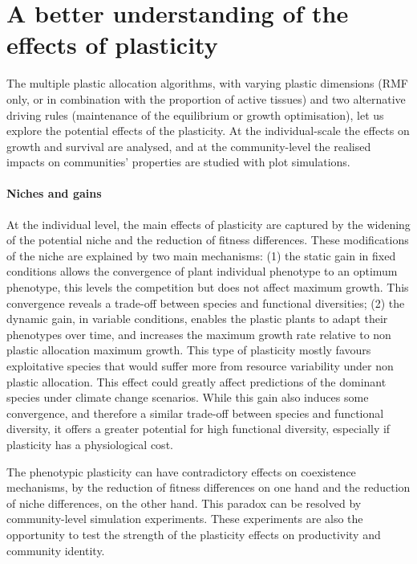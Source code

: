 \section{A better understanding of the effects of plasticity}

The multiple plastic allocation algorithms, with varying plastic dimensions (RMF only, or in combination with the proportion of active tissues) and two alternative driving rules (maintenance of the equilibrium or growth optimisation), let us explore the potential effects of the plasticity. At the individual-scale the effects on growth and survival are analysed, and at the community-level the realised impacts on communities' properties are studied with plot simulations.

\paragraph{Niches and gains}

At the individual level, the main effects of plasticity are captured by the widening of the potential niche and the reduction of fitness differences. These modifications of the niche are explained by two main mechanisms: (1) the static gain in fixed conditions allows the convergence of plant individual phenotype to an optimum phenotype, this levels the competition but does not affect maximum growth. This convergence reveals a trade-off between species and functional diversities; (2) the dynamic gain, in variable conditions, enables the plastic plants to adapt their phenotypes over time, and increases the maximum growth rate relative to non plastic allocation maximum growth. This type of plasticity mostly favours exploitative species that would suffer more from resource variability under non plastic allocation. This effect could greatly affect predictions of the dominant species under climate change scenarios. While this gain also induces some convergence, and therefore a similar trade-off between species and functional diversity, it offers a greater potential for high functional diversity, especially if plasticity has a physiological cost.

The phenotypic plasticity can have contradictory effects on coexistence mechanisms, by the reduction of fitness differences on one hand and the reduction of niche differences, on the other hand. This paradox can be resolved by community-level simulation experiments. These experiments are also the opportunity to test the strength of the plasticity effects on productivity and community identity.

